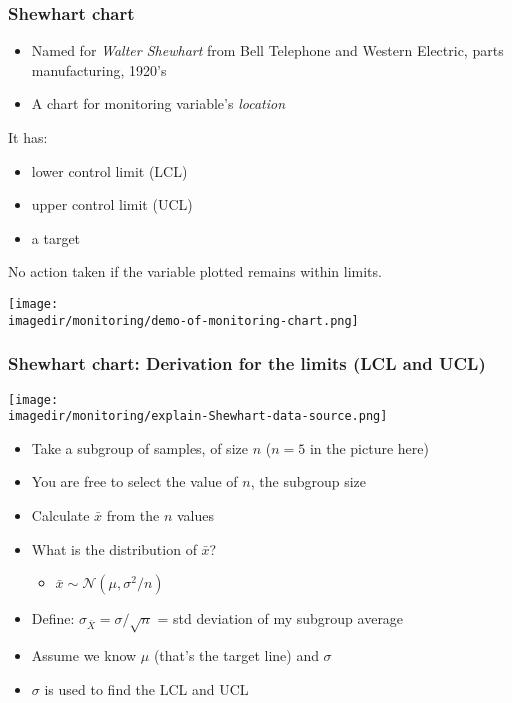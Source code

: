 \begin{frame}\frametitle{Shewhart chart}
	\begin{itemize}
		\item	Named for \emph{Walter Shewhart} from Bell Telephone and Western Electric, parts manufacturing, 1920's
		\item	A chart for monitoring variable's \emph{location}
	\end{itemize}

	\vspace{12pt}

	It has:
	\begin{itemize}
		\item	lower control limit (LCL)
		\item	upper control limit (UCL)
		\item	a target
	\end{itemize}

	\vspace{12pt}
	No action taken if the variable plotted remains within limits.
	\\
	{}
	\begin{center}
		\texttt{[image: \\imagedir/monitoring/demo-of-monitoring-chart.png]}
	\end{center}
\end{frame}

\begin{frame}\frametitle{Shewhart chart: Derivation for the limits (LCL and UCL)}
	\begin{center}
		\texttt{[image: \\imagedir/monitoring/explain-Shewhart-data-source.png]}
	\end{center}
	
	\begin{itemize}
		\item	Take a subgroup of samples, of size $n$ {\small ($n=5$ in the picture here)}
		\item	You are free to select the value of $n$, the subgroup size
		\item	Calculate $\bar{x}$ from the $n$ values
		\item	What is the distribution of $\bar{x}$?
		\begin{itemize}
			\item	$\bar{x} \sim \mathcal{N}(\mu, \sigma^2/n)$
		\end{itemize}
		\item	Define: $\sigma_{\bar{X}} = \sigma/\sqrt{n}$ = std deviation of my subgroup average
		\item	Assume we know $\mu$ (that's the target line) and $\sigma$
		\item	$\sigma$ is used to find the LCL and UCL
	\end{itemize}
\end{frame}

